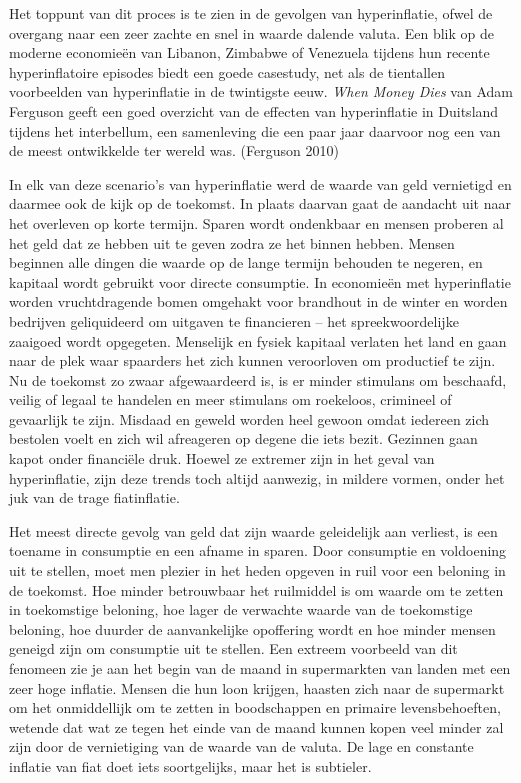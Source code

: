 \documentclass[
  a5paper,
  smalldemyvopaper,11pt,twoside,onecolumn,openright,extrafontsizes,
hidelinks]{memoir}
\begin{document}
Het toppunt van dit proces is te zien in de gevolgen van hyperinflatie,
ofwel de overgang naar een zeer zachte en snel in waarde dalende valuta.
Een blik op de moderne economieën van Libanon, Zimbabwe of Venezuela
tijdens hun recente hyperinflatoire episodes biedt een goede casestudy,
net als de tientallen voorbeelden van hyperinflatie in de twintigste
eeuw. \emph{When Money Dies} van Adam Ferguson geeft een goed overzicht
van de effecten van hyperinflatie in Duitsland tijdens het interbellum,
een samenleving die een paar jaar daarvoor nog een van de meest
ontwikkelde ter wereld was. (Ferguson 2010)

In elk van deze scenario's van hyperinflatie werd de waarde van geld
vernietigd en daarmee ook de kijk op de toekomst. In plaats daarvan gaat
de aandacht uit naar het overleven op korte termijn. Sparen wordt
ondenkbaar en mensen proberen al het geld dat ze hebben uit te geven
zodra ze het binnen hebben. Mensen beginnen alle dingen die waarde op de
lange termijn behouden te negeren, en kapitaal wordt gebruikt voor
directe consumptie. In economieën met hyperinflatie worden
vruchtdragende bomen omgehakt voor brandhout in de winter en worden
bedrijven geliquideerd om uitgaven te financieren -- het
spreekwoordelijke zaaigoed wordt opgegeten. Menselijk en fysiek kapitaal
verlaten het land en gaan naar de plek waar spaarders het zich kunnen
veroorloven om productief te zijn. Nu de toekomst zo zwaar afgewaardeerd
is, is er minder stimulans om beschaafd, veilig of legaal te handelen en
meer stimulans om roekeloos, crimineel of gevaarlijk te zijn. Misdaad en
geweld worden heel gewoon omdat iedereen zich bestolen voelt en zich wil
afreageren op degene die iets bezit. Gezinnen gaan kapot onder
financiële druk. Hoewel ze extremer zijn in het geval van hyperinflatie,
zijn deze trends toch altijd aanwezig, in mildere vormen, onder het juk
van de trage fiatinflatie.

Het meest directe gevolg van geld dat zijn waarde geleidelijk aan
verliest, is een toename in consumptie en een afname in sparen. Door
consumptie en voldoening uit te stellen, moet men plezier in het heden
opgeven in ruil voor een beloning in de toekomst. Hoe minder betrouwbaar
het ruilmiddel is om waarde om te zetten in toekomstige beloning, hoe
lager de verwachte waarde van de toekomstige beloning, hoe duurder de
aanvankelijke opoffering wordt en hoe minder mensen geneigd zijn om
consumptie uit te stellen. Een extreem voorbeeld van dit fenomeen zie je
aan het begin van de maand in supermarkten van landen met een zeer hoge
inflatie. Mensen die hun loon krijgen, haasten zich naar de supermarkt
om het onmiddellijk om te zetten in boodschappen en primaire
levensbehoeften, wetende dat wat ze tegen het einde van de maand kunnen
kopen veel minder zal zijn door de vernietiging van de waarde van de
valuta. De lage en constante inflatie van fiat doet iets soortgelijks,
maar het is subtieler.
\end{document}
